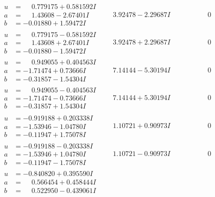 \documentclass[1p]{elsarticle_modified}
\theoremstyle{definition}
\begin{document}
$$\begin{array}{c|c|c}
\begin{aligned}
u &= \phantom{-}0.779175 + 0.581592 I \\
a &= \phantom{-}1.43608 - 2.67401 I \\
b &= -0.01880 + 1.59472 I\end{aligned}
 & \phantom{-}3.92478 - 2.29687 I & \phantom{-0.000000 } 0 \\ \hline\begin{aligned}
u &= \phantom{-}0.779175 - 0.581592 I \\
a &= \phantom{-}1.43608 + 2.67401 I \\
b &= -0.01880 - 1.59472 I\end{aligned}
 & \phantom{-}3.92478 + 2.29687 I & \phantom{-0.000000 } 0 \\ \hline\begin{aligned}
u &= \phantom{-}0.949055 + 0.404563 I \\
a &= -1.71474 + 0.73666 I \\
b &= -0.31857 - 1.54304 I\end{aligned}
 & \phantom{-}7.14144 - 5.30194 I & \phantom{-0.000000 } 0 \\ \hline\begin{aligned}
u &= \phantom{-}0.949055 - 0.404563 I \\
a &= -1.71474 - 0.73666 I \\
b &= -0.31857 + 1.54304 I\end{aligned}
 & \phantom{-}7.14144 + 5.30194 I & \phantom{-0.000000 } 0 \\ \hline\begin{aligned}
u &= -0.919188 + 0.203338 I \\
a &= -1.53946 - 1.04780 I \\
b &= -0.11947 + 1.75078 I\end{aligned}
 & \phantom{-}1.10721 + 0.90973 I & \phantom{-0.000000 } 0 \\ \hline\begin{aligned}
u &= -0.919188 - 0.203338 I \\
a &= -1.53946 + 1.04780 I \\
b &= -0.11947 - 1.75078 I\end{aligned}
 & \phantom{-}1.10721 - 0.90973 I & \phantom{-0.000000 } 0 \\ \hline\begin{aligned}
u &= -0.840820 + 0.395590 I \\
a &= \phantom{-}0.566454 + 0.458444 I \\
b &= \phantom{-}0.522950 - 0.439061 I\end{aligned}

\end{array}$$
\end{document}
